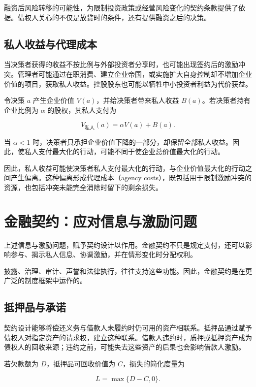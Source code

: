 融资后风险转移的可能性，为限制投资政策或经营风险变化的契约条款提供了依据。债权人关心的不仅是放贷时的条件，还有提供融资之后的决策。

\subsection{私人收益与代理成本}

当决策者获得的收益不按比例与外部投资者分享时，也可能出现签约后的激励冲突。管理者可能通过在职消费、建立企业帝国，或实施扩大自身控制却不增加企业价值的项目，获取私人收益。控股股东也可能以牺牲中小投资者利益为代价获益。

令决策 $a$ 产生企业价值 $V(a)$，并给决策者带来私人收益 $B(a)$。若决策者持有企业比例为 $\alpha$ 的股权，其私人支付为

\begin{equation}
V_{\text{私人}}(a)=\alpha V(a)+B(a).
\label{eq:ch3-private-benefits}
\end{equation}

当 $\alpha<1$ 时，决策者只承担企业价值下降的一部分，却保留全部私人收益。因此，使私人支付最大化的行动，可能不同于使企业总价值最大化的行动。

因此，私人收益可能使决策者私人支付最大化的行动，与企业价值最大化的行动之间产生偏离。这种偏离形成代理成本（agency costs），既包括用于限制激励冲突的资源，也包括冲突未能完全消除时留下的剩余损失。

\section{金融契约：应对信息与激励问题}

上述信息与激励问题，赋予契约设计以作用。金融契约不只是规定支付，还可以影响参与、揭示私人信息、协调激励，并在情形变化时分配权利。

披露、治理、审计、声誉和法律执行，往往支持这些功能。因此，金融契约是在更广泛的制度框架中运作的。

\subsection{抵押品与承诺}

契约设计能够将偿还义务与借款人未履约时仍可用的资产相联系。抵押品通过赋予债权人对指定资产的请求权，建立这种联系。借款人违约时，质押或抵押资产成为债权人的回收来源；违约之前，可能失去这些资产的后果也会影响借款人激励。

若欠款额为 $D$，抵押品可回收价值为 $C$，损失的简化度量为

\begin{equation}
L=\max\{D-C,0\}.
\label{eq:ch3-collateral-loss}
\end{equation}

